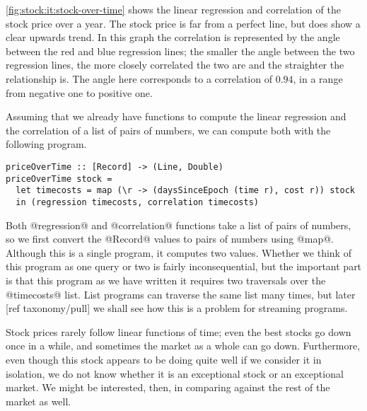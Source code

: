 

\autoref{fig:stock:it:stock-over-time} shows the linear regression and correlation of the stock price over a year.
The stock price is far from a perfect line, but does show a clear upwards trend.
In this graph the correlation is represented by the angle between the red and blue regression lines; the smaller the angle between the two regression lines, the more closely correlated the two are and the straighter the relationship is.
The angle here corresponds to a correlation of $0.94$, in a range from negative one to positive one.


Assuming that we already have functions to compute the linear regression and the correlation of a list of pairs of numbers, we can compute both with the following program.

\begin{lstlisting}
priceOverTime :: [Record] -> (Line, Double)
priceOverTime stock =
  let timecosts = map (\r -> (daysSinceEpoch (time r), cost r)) stock
  in (regression timecosts, correlation timecosts)
\end{lstlisting}

Both @regression@ and @correlation@ functions take a list of pairs of numbers, so we first convert the @Record@ values to pairs of numbers using @map@.
Although this is a single program, it computes two values.
Whether we think of this program as one query or two is fairly inconsequential, but the important part is that this program as we have written it requires two traversals over the @timecosts@ list.
List programs can traverse the same list many times, but later [ref taxonomy/pull] we shall see how this is a problem for streaming programs.

Stock prices rarely follow linear functions of time; even the best stocks go down once in a while, and sometimes the market as a whole can go down.
Furthermore, even though this stock appears to be doing quite well if we consider it in isolation, we do not know whether it is an exceptional stock or an exceptional market.
We might be interested, then, in comparing against the rest of the market as well.

